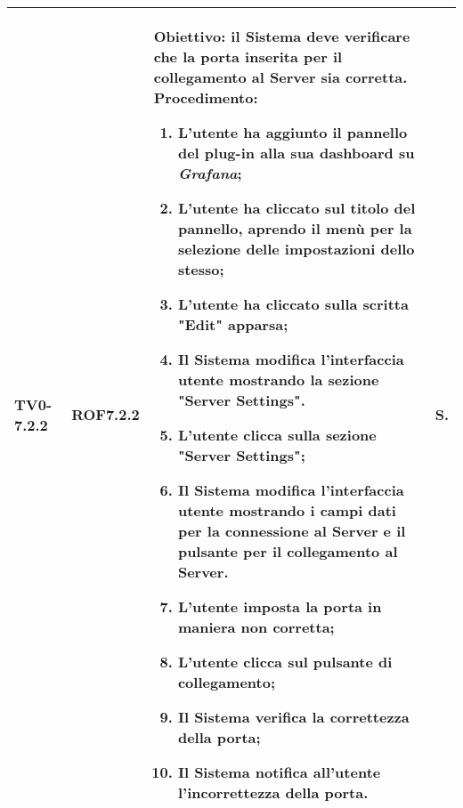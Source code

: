 \begin{longtable}{|C{.15\textwidth}|C{.13\textwidth}|m{.65\textwidth}|C{.08\textwidth}|}
TV0-7.2.2 & ROF7.2.2 &
	\textbf{Obiettivo}: il Sistema deve verificare che la porta inserita per il collegamento al Server sia corretta. \newline
	\textbf{Procedimento}:
	\begin{enumerate}
		\item L'utente ha aggiunto il pannello del plug-in alla sua dashboard su \textit{Grafana};
		\item L'utente ha cliccato sul titolo del pannello, aprendo il menù per la selezione delle impostazioni dello stesso;
		\item L'utente ha cliccato sulla scritta "Edit" apparsa;
		\item Il Sistema modifica l'interfaccia utente mostrando la sezione "Server Settings".
		\item L'utente clicca sulla sezione "Server Settings";
		\item Il Sistema modifica l'interfaccia utente mostrando i campi dati per la connessione al Server e il pulsante per il collegamento al Server.
		\item L'utente imposta la porta in maniera non corretta;
		\item L'utente clicca sul pulsante di collegamento;
		\item Il Sistema verifica la correttezza della porta;
		\item Il Sistema notifica all'utente l'incorrettezza della porta.
	\end{enumerate}
	& S. \\
\hline


\end{longtable}
